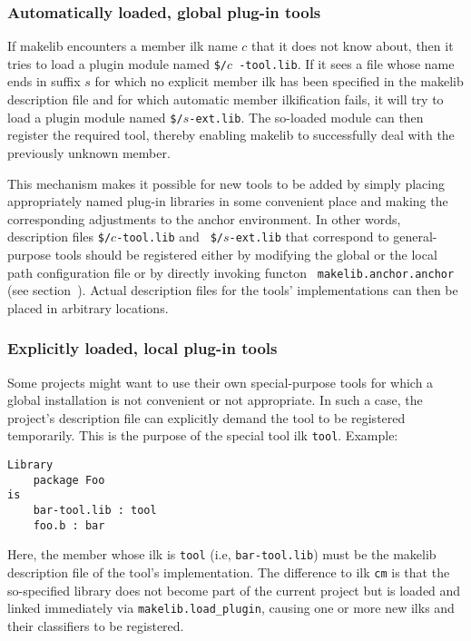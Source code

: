 \subsubsection{Automatically loaded, global plug-in tools}

If makelib encounters a member ilk name $c$ that it does not know about,
then it tries to load a plugin module named {\tt \$/}$c${\tt
-tool.lib}.  If it sees a file whose name ends in suffix $s$ for which
no explicit member ilk has been specified in the makelib description file
and for which automatic member ilkification fails, it will try to
load a plugin module named {\tt \$/}$s${\tt -ext.lib}.  The so-loaded
module can then register the required tool, thereby enabling makelib to
successfully deal with the previously unknown member.

This mechanism makes it possible for new tools to be added by simply
placing appropriately named plug-in libraries in some convenient place
and making the corresponding adjustments to the anchor environment.
In other words, description files {\tt \$/}$c${\tt -tool.lib} and {\tt
\$/}$s${\tt -ext.lib} that correspond to general-purpose tools should
be registered either by modifying the global or the local path
configuration file or by directly invoking functon {\tt
makelib.anchor.anchor} (see section~).  Actual
description files for the tools' implementations can then be placed in
arbitrary locations.

\subsubsection{Explicitly loaded, local plug-in tools}
\label{sec:localtools}

Some projects might want to use their own special-purpose tools for
which a global installation is not convenient or not appropriate.  In
such a case, the project's description file can explicitly demand the
tool to be registered temporarily.  This is the purpose of the special
tool ilk {\tt tool}.  Example:

\begin{verbatim}
Library
    package Foo
is
    bar-tool.lib : tool
    foo.b : bar
\end{verbatim}

Here, the member whose ilk is {\tt tool} (i.e, {\tt bar-tool.lib})
must be the makelib description file of the tool's implementation.  The
difference to ilk {\tt cm} is that the so-specified library does not
become part of the current project but is loaded and linked
immediately via {\tt makelib.load\_plugin}, causing one or more new ilks
and their classifiers to be registered.

